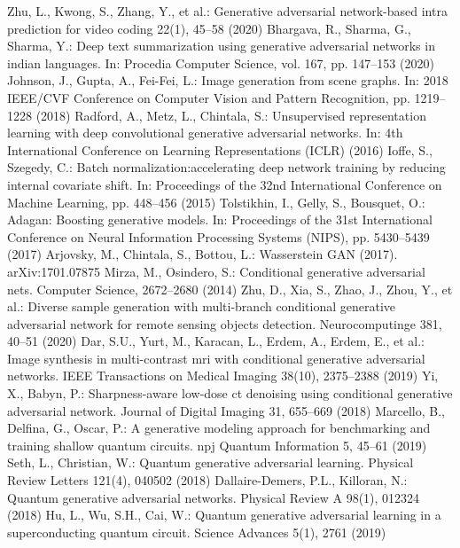 \documentclass{bmcart}
\begin{document}
\begin{backmatter}
\begin{thebibliography}{99}
 Zhu, L., Kwong, S., Zhang, Y., et al.: Generative adversarial network-based intra prediction for video coding 22(1), 45–58 (2020) 
 Bhargava, R., Sharma, G., Sharma, Y.: Deep text summarization using generative adversarial networks in indian languages. In: Procedia Computer Science, vol. 167, pp. 147–153 (2020)
Johnson, J., Gupta, A., Fei-Fei, L.: Image generation from scene graphs. In: 2018 IEEE/CVF Conference on Computer Vision and Pattern Recognition, pp. 1219–1228 (2018) 
Radford, A., Metz, L., Chintala, S.: Unsupervised representation learning with deep convolutional generative adversarial networks. In: 4th International Conference on Learning Representations (ICLR) (2016) 
 Ioffe, S., Szegedy, C.: Batch normalization:accelerating deep network training by reducing internal covariate shift. In: Proceedings of the 32nd International Conference on Machine Learning, pp. 448–456 (2015) 
Tolstikhin, I., Gelly, S., Bousquet, O.: Adagan: Boosting generative models. In: Proceedings of the 31st International Conference on Neural Information Processing Systems (NIPS), pp. 5430–5439 (2017) 
Arjovsky, M., Chintala, S., Bottou, L.: Wasserstein GAN (2017). arXiv:1701.07875
 Mirza, M., Osindero, S.: Conditional generative adversarial nets. Computer Science, 2672–2680 (2014) 
 Zhu, D., Xia, S., Zhao, J., Zhou, Y., et al.: Diverse sample generation with multi-branch conditional generative adversarial network for remote sensing objects detection. Neurocomputinge 381, 40–51 (2020) 
 Dar, S.U., Yurt, M., Karacan, L., Erdem, A., Erdem, E., et al.: Image synthesis in multi-contrast mri with conditional generative adversarial networks. IEEE Transactions on Medical Imaging 38(10), 2375–2388 (2019) 
 Yi, X., Babyn, P.: Sharpness-aware low-dose ct denoising using conditional generative adversarial network. Journal of Digital Imaging 31, 655–669 (2018) 
 Marcello, B., Delfina, G., Oscar, P.: A generative modeling approach for benchmarking and training shallow quantum circuits. npj Quantum Information 5, 45–61 (2019)
Seth, L., Christian, W.: Quantum generative adversarial learning. Physical Review Letters 121(4), 040502 (2018) 
Dallaire-Demers, P.L., Killoran, N.: Quantum generative adversarial networks. Physical Review A 98(1), 012324 (2018)
Hu, L., Wu, S.H., Cai, W.: Quantum generative adversarial learning in a superconducting quantum circuit. Science Advances 5(1), 2761 (2019) 

\end{thebibliography}
\end{backmatter}
\end{document}
